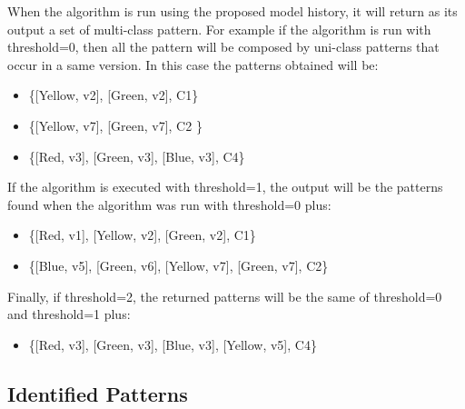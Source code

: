 \documentclass[11pt]{article} %
\begin{document}
When the algorithm is run using the proposed model history, it will return as its output a set of multi-class pattern. For example if the algorithm is run with threshold=0, then all the pattern will be composed by uni-class patterns that occur in a same version. In this case the patterns obtained will be: 
\begin{itemize}
\item \{[Yellow, v2], [Green, v2], C1\}
\item \{[Yellow, v7], [Green, v7], C2 \}
\item \{[Red, v3], [Green, v3], [Blue, v3], C4\}
\end{itemize}

If the algorithm is executed with  threshold=1, the output will be the patterns found when the algorithm was run with threshold=0 plus:
\begin{itemize}
\item \{[Red, v1], [Yellow, v2], [Green, v2], C1\}
\item \{[Blue, v5], [Green, v6], [Yellow, v7], [Green, v7], C2\}
\end{itemize}

Finally, if threshold=2, the returned patterns will be the same of threshold=0 and threshold=1 plus:
\begin{itemize}
\item \{[Red, v3], [Green, v3], [Blue, v3], [Yellow, v5], C4\}
\end{itemize}

\subsection{Identified Patterns}
\end{document}
